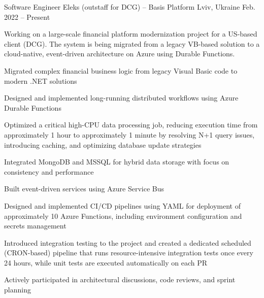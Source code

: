 

\begin{cventries}

  \cventry
    {Software Engineer} %
    {Eleks (outstaff for DCG) – Basis Platform} %
    {Lviv, Ukraine} %
    {Feb. 2022 – Present} %
    {
      \begin{cvitems} %
        \item {Working on a large-scale financial platform modernization project for a US-based client (DCG). The system is being migrated from a legacy VB-based solution to a cloud-native, event-driven architecture on Azure using Durable Functions.}
        \item {Migrated complex financial business logic from legacy Visual Basic code to modern .NET solutions}
        \item {Designed and implemented long-running distributed workflows using Azure Durable Functions}
        \item {Optimized a critical high-CPU data processing job, reducing execution time from approximately 1 hour to approximately 1 minute by resolving N+1 query issues, introducing caching, and optimizing database update strategies}
        \item {Integrated MongoDB and MSSQL for hybrid data storage with focus on consistency and performance}
        \item {Built event-driven services using Azure Service Bus}
        \item {Designed and implemented CI/CD pipelines using YAML for deployment of approximately 10 Azure Functions, including environment configuration and secrets management}
        \item {Introduced integration testing to the project and created a dedicated scheduled (CRON-based) pipeline that runs resource-intensive integration tests once every 24 hours, while unit tests are executed automatically on each PR}
        \item {Actively participated in architectural discussions, code reviews, and sprint planning}

\end{cvitems}}
\end{cventries}
